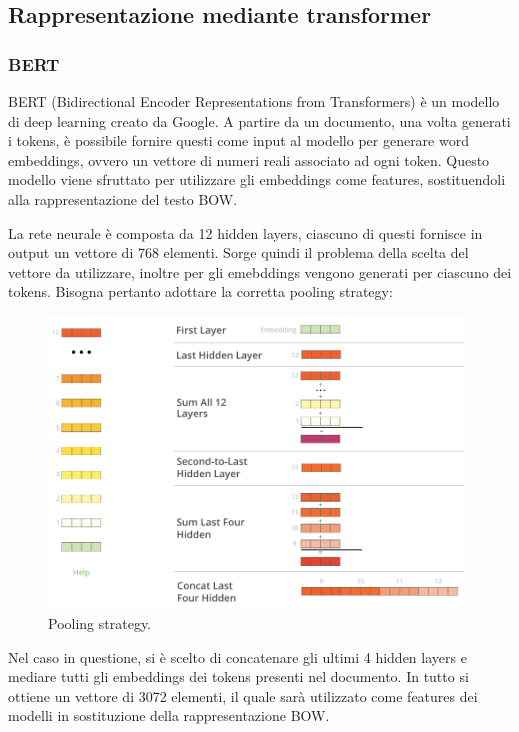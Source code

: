 \documentclass[oneside]{book}
\begin{document}
\subsection{Rappresentazione mediante transformer}
\subsubsection{BERT}
BERT (Bidirectional Encoder Representations from Transformers) è un modello di deep learning creato da Google. A partire da un documento, una volta generati i tokens, è possibile fornire questi come input al modello per generare word embeddings, ovvero un vettore di numeri reali associato ad ogni token. Questo modello viene sfruttato per utilizzare gli embeddings come features, sostituendoli alla rappresentazione del testo BOW.

La rete neurale è composta da 12 hidden layers, ciascuno di questi fornisce in output un vettore di 768 elementi. Sorge quindi il problema della scelta del vettore da utilizzare, inoltre per gli emebddings vengono generati per ciascuno dei tokens. Bisogna pertanto adottare la corretta pooling strategy:

\begin{figure}[!h]
	\centering
	\includegraphics[width=11cm]{assets/pooling-strategy.png}
	\caption[Caption for LOF]{Pooling strategy. \footnotemark}
\end{figure}

\noindent
Nel caso in questione, si è scelto di concatenare gli ultimi 4 hidden layers e mediare tutti gli embeddings dei tokens presenti nel documento. In tutto si ottiene un vettore di 3072 elementi, il quale sarà utilizzato come features dei modelli in sostituzione della rappresentazione BOW.
\end{document}
